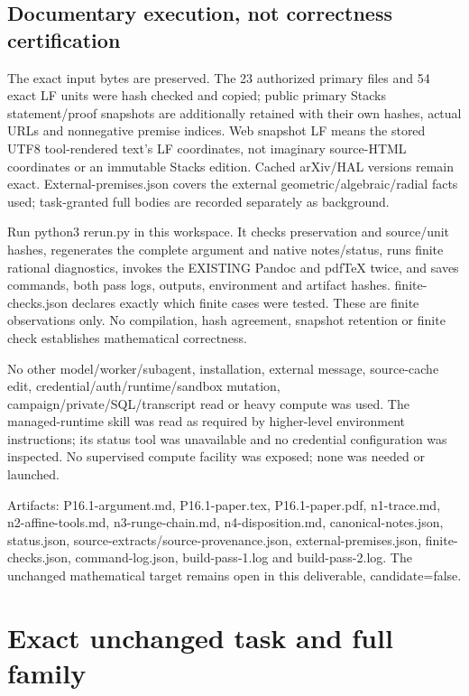 \documentclass[
  10pt,
]{article}
\begin{document}
\subsection{Documentary execution, not correctness
certification}\label{documentary-execution-not-correctness-certification}

The exact input bytes are preserved. The 23 authorized primary files and
54 exact LF units were hash checked and copied; public primary Stacks
statement/proof snapshots are additionally retained with their own
hashes, actual URLs and nonnegative premise indices. Web snapshot LF
means the stored UTF8 tool-rendered text's LF coordinates, not imaginary
source-HTML coordinates or an immutable Stacks edition. Cached arXiv/HAL
versions remain exact. External-premises.json covers the external
geometric/algebraic/radial facts used; task-granted full bodies are
recorded separately as background.

Run python3 rerun.py in this workspace. It checks preservation and
source/unit hashes, regenerates the complete argument and native
notes/status, runs finite rational diagnostics, invokes the EXISTING
Pandoc and pdfTeX twice, and saves commands, both pass logs, outputs,
environment and artifact hashes. finite-checks.json declares exactly
which finite cases were tested. These are finite observations only. No
compilation, hash agreement, snapshot retention or finite check
establishes mathematical correctness.

No other model/worker/subagent, installation, external message,
source-cache edit, credential/auth/runtime/sandbox mutation,
campaign/private/SQL/transcript read or heavy compute was used. The
managed-runtime skill was read as required by higher-level environment
instructions; its status tool was unavailable and no credential
configuration was inspected. No supervised compute facility was exposed;
none was needed or launched.

Artifacts: P16.1-argument.md, P16.1-paper.tex, P16.1-paper.pdf,
n1-trace.md, n2-affine-tools.md, n3-runge-chain.md, n4-disposition.md,
canonical-notes.json, status.json,
source-extracts/source-provenance.json, external-premises.json,
finite-checks.json, command-log.json, build-pass-1.log and
build-pass-2.log. The unchanged mathematical target remains open in this
deliverable, candidate=false.

\section{Exact unchanged task and full
family}\label{exact-unchanged-task-and-full-family}
\end{document}
